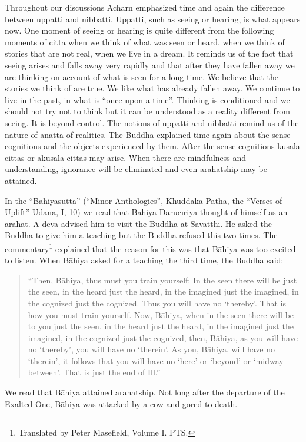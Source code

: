 Throughout our discussions Acharn emphasized time and again the
difference between uppatti and nibbatti. Uppatti, such as seeing or
hearing, is what appears now. One moment of seeing or hearing is quite
different from the following moments of citta when we think of what was
seen or heard, when we think of stories that are not real, when we live
in a dream. It reminds us of the fact that seeing arises and falls away
very rapidly and that after they have fallen away we are thinking on
account of what is seen for a long time. We believe that the stories we
think of are true. We like what has already fallen away. We continue to
live in the past, in what is ``once upon a time''. Thinking is
conditioned and we should not try not to think but it can be understood
as a reality different from seeing. It is beyond control. The notions of
uppatti and nibbatti remind us of the nature of anattā of realities. The
Buddha explained time again about the sense-cognitions and the objects
experienced by them. After the sense-cognitions kusala cittas or akusala
cittas may arise. When there are mindfulness and understanding,
ignorance will be eliminated and even arahatship may be attained.

In the ``Bāhiyasutta'' (``Minor Anthologies'', Khuddaka Patha, the
``Verses of Uplift'' Udāna, I, 10) we read that Bāhiya Dārucīriya
thought of himself as an arahat. A deva advised him to visit the Buddha
at Sāvatthī. He asked the Buddha to give him a teaching but the Buddha
refused this two times. The
commentary\footnote{Translated by Peter
Masefield, Volume I. PTS.} explained
that the reason for this was that Bāhiya was too excited to listen. When
Bāhiya asked for a teaching the third time, the Buddha said:

\begin{quote}
``Then, Bāhiya, thus must you train yourself: In the seen there will be
just the seen, in the heard just the heard, in the imagined just the
imagined, in the cognized just the cognized. Thus you will have no
`thereby'. That is how you must train yourself. Now, Bāhiya, when in the
seen there will be to you just the seen, in the heard just the heard, in
the imagined just the imagined, in the cognized just the cognized, then,
Bāhiya, as you will have no `thereby', you will have no `therein'. As
you, Bāhiya, will have no `therein', it follows that you will have no
`here' or `beyond' or `midway between'. That is just the end of Ill.''
\end{quote}

We read that Bāhiya attained arahatship. Not long after the departure of
the Exalted One, Bāhiya was attacked by a cow and gored to death.

